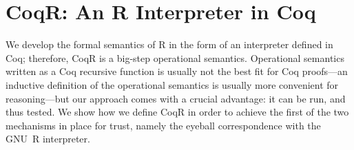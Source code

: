 \documentclass[
    sigplan,
    10pt,
    review, %
    natbib=false %
 ]{acmart}
\newcommand\mb[1]{\todo[color=purple!20,size=\scriptsize]{#1}}
\newcommand\et[1]{\todo[color=blue!20,size=\scriptsize]{#1}}
\newcommand\eti[1]{\todo[color=blue!20,inline]{#1}}
\newcommand\CoqR{CoqR}
\begin{document}



%
%




\section{\CoqR: An R Interpreter in Coq}
\label{sec:coq:interp}

We develop the formal semantics of R in the form of an interpreter defined in Coq; therefore, \CoqR{} is a big-step operational semantics.
Operational semantics written as a Coq recursive function is usually not the best fit for Coq proofs---an inductive definition of the operational semantics is usually more convenient for reasoning---but our approach comes with a crucial advantage: it can be run, and thus tested.
%
We show how we define \CoqR{} in order to achieve the first of the two mechanisms in place for trust, 
namely the eyeball correspondence with the GNU~R interpreter.
\end{document}
